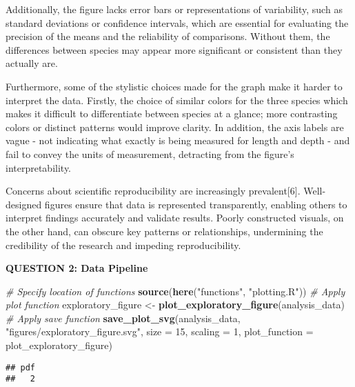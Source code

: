 \documentclass[
]{article}
\newenvironment{Shaded}{\begin{snugshade}}{\end{snugshade}}
\newcommand{\AttributeTok}[1]{\textcolor[rgb]{0.13,0.29,0.53}{#1}}
\newcommand{\CommentTok}[1]{\textcolor[rgb]{0.56,0.35,0.01}{\textit{#1}}}
\newcommand{\DecValTok}[1]{\textcolor[rgb]{0.00,0.00,0.81}{#1}}
\newcommand{\FunctionTok}[1]{\textcolor[rgb]{0.13,0.29,0.53}{\textbf{#1}}}
\newcommand{\NormalTok}[1]{#1}
\newcommand{\OtherTok}[1]{\textcolor[rgb]{0.56,0.35,0.01}{#1}}
\newcommand{\StringTok}[1]{\textcolor[rgb]{0.31,0.60,0.02}{#1}}
\begin{document}
Additionally, the figure lacks error bars or representations of
variability, such as standard deviations or confidence intervals, which
are essential for evaluating the precision of the means and the
reliability of comparisons. Without them, the differences between
species may appear more significant or consistent than they actually
are.

Furthermore, some of the stylistic choices made for the graph make it
harder to interpret the data. Firstly, the choice of similar colors for
the three species which makes it difficult to differentiate between
species at a glance; more contrasting colors or distinct patterns would
improve clarity. In addition, the axis labels are vague - not indicating
what exactly is being measured for length and depth - and fail to convey
the units of measurement, detracting from the figure's interpretability.

Concerns about scientific reproducibility are increasingly
prevalent{[}6{]}. Well-designed figures ensure that data is represented
transparently, enabling others to interpret findings accurately and
validate results. Poorly constructed visuals, on the other hand, can
obscure key patterns or relationships, undermining the credibility of
the research and impeding reproducibility.

\textbf{QUESTION 2: Data Pipeline}

\begin{Shaded}
\begin{Highlighting}[]
\CommentTok{\# Specify location of functions }
\FunctionTok{source}\NormalTok{(}\FunctionTok{here}\NormalTok{(}\StringTok{"functions"}\NormalTok{, }\StringTok{"plotting.R"}\NormalTok{))}
\CommentTok{\# Apply plot function}
\NormalTok{exploratory\_figure }\OtherTok{\textless{}{-}} \FunctionTok{plot\_exploratory\_figure}\NormalTok{(analysis\_data)}
\CommentTok{\# Apply save function}
\FunctionTok{save\_plot\_svg}\NormalTok{(analysis\_data, }
                      \StringTok{"figures/exploratory\_figure.svg"}\NormalTok{, }
                      \AttributeTok{size =} \DecValTok{15}\NormalTok{, }
                      \AttributeTok{scaling =} \DecValTok{1}\NormalTok{, }
                      \AttributeTok{plot\_function =}\NormalTok{ plot\_exploratory\_figure)}
\end{Highlighting}
\end{Shaded}

\begin{verbatim}
## pdf 
##   2
\end{verbatim}
\end{document}
